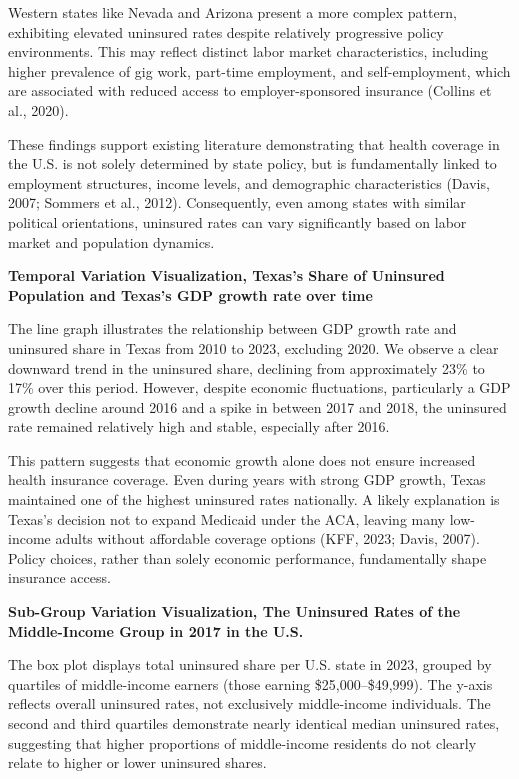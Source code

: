 \documentclass[
]{article}
\begin{document}
Western states like Nevada and Arizona present a more complex pattern,
exhibiting elevated uninsured rates despite relatively progressive
policy environments. This may reflect distinct labor market
characteristics, including higher prevalence of gig work, part-time
employment, and self-employment, which are associated with reduced
access to employer-sponsored insurance (Collins et al., 2020).

These findings support existing literature demonstrating that health
coverage in the U.S. is not solely determined by state policy, but is
fundamentally linked to employment structures, income levels, and
demographic characteristics (Davis, 2007; Sommers et al., 2012).
Consequently, even among states with similar political orientations,
uninsured rates can vary significantly based on labor market and
population dynamics.

\textbf{Temporal Variation Visualization, Texas's Share of Uninsured
Population and Texas's GDP growth rate over time}

The line graph illustrates the relationship between GDP growth rate and
uninsured share in Texas from 2010 to 2023, excluding 2020. We observe a
clear downward trend in the uninsured share, declining from
approximately 23\% to 17\% over this period. However, despite economic
fluctuations, particularly a GDP growth decline around 2016 and a spike
in between 2017 and 2018, the uninsured rate remained relatively high
and stable, especially after 2016.

This pattern suggests that economic growth alone does not ensure
increased health insurance coverage. Even during years with strong GDP
growth, Texas maintained one of the highest uninsured rates nationally.
A likely explanation is Texas's decision not to expand Medicaid under
the ACA, leaving many low-income adults without affordable coverage
options (KFF, 2023; Davis, 2007). Policy choices, rather than solely
economic performance, fundamentally shape insurance access.

\textbf{Sub-Group Variation Visualization, The Uninsured Rates of the
Middle-Income Group in 2017 in the U.S.}

The box plot displays total uninsured share per U.S. state in 2023,
grouped by quartiles of middle-income earners (those earning
\$25,000--\$49,999). The y-axis reflects overall uninsured rates, not
exclusively middle-income individuals. The second and third quartiles
demonstrate nearly identical median uninsured rates, suggesting that
higher proportions of middle-income residents do not clearly relate to
higher or lower uninsured shares.
\end{document}
